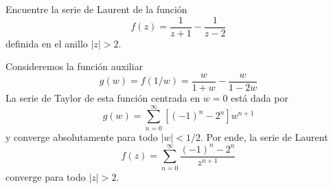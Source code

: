 \begin{exercise}
Encuentre la serie de Laurent de la función
$$f(z) = \frac 1 {z+1} - \frac 1 {z-2}$$
definida en el anillo $|z| > 2$.
\end{exercise}

\begin{solution}
Consideremos la función auxiliar
$$g(w) = f(1/w) = \frac w {1+w} - \frac w {1-2w}$$
La serie de Taylor de esta función centrada en $w = 0$ está dada por
$$g(w) = \sum_{n=0}^\infty \left[ (-1)^n - 2^n \right] w^{n+1}$$
y converge absolutamente para todo $|w| < 1/2$. Por ende, la serie de Laurent
$$f(z) = \sum_{n=0}^\infty \frac {(-1)^n - 2^n} {z^{n+1}}$$
converge para todo $|z| > 2$.
\end{solution}
